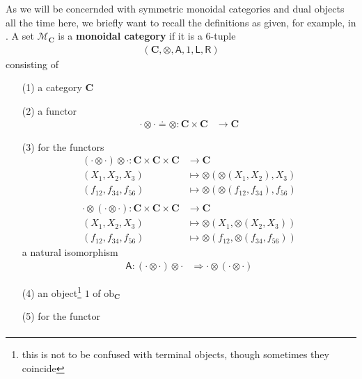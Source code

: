 As we will be concernded with symmetric monoidal categories and dual objects all the time here, we briefly want to recall the definitions as given, for example, in \cite{00000001}. A set $\mathcal{M}_{\mathbf{C}}$ is a \textbf{monoidal category} if it is a $6$-tuple
\begin{align*}
  \left(
    \mathbf{C},
    \otimes,
    \mathsf{A},
    1,
    \mathsf{L},
    \mathsf{R}
  \right)
\end{align*}
consisting of
\begin{enumerate}
\item[(1)]
a category $\mathbf{C}$
\item[(2)]
a functor
\begin{align*}
  \cdot
  \otimes
  \cdot
  \doteq
  \otimes
  \colon
  \mathbf{C}
  \times
  \mathbf{C}
  &\rightarrow
  \mathbf{C}
\end{align*}
\item[(3)]
for the functors
\begin{align*}
  \left(
    \cdot
    \otimes
    \cdot
  \right)
  \otimes
  \cdot
  \colon
  \mathbf{C}
  \times
  \mathbf{C}
  \times
  \mathbf{C}
  &\rightarrow
  \mathbf{C}
  \\
  (X_{1},X_{2},X_{3})
  &\mapsto
  \otimes(\otimes(X_{1},X_{2}),X_{3})
  \\
  (f_{12},f_{34},f_{56})
  &\mapsto
  \otimes(\otimes(f_{12},f_{34}),f_{56})
  \\\\
  \cdot
  \otimes
  \left(
    \cdot
    \otimes
    \cdot
  \right)
  \colon
  \mathbf{C}
  \times
  \mathbf{C}
  \times
  \mathbf{C}
  &\rightarrow
  \mathbf{C}
  \\
  (X_{1},X_{2},X_{3})
  &\mapsto
  \otimes(X_{1},\otimes(X_{2},X_{3}))
  \\
  (f_{12},f_{34},f_{56})
  &\mapsto
  \otimes(f_{12},\otimes(f_{34},f_{56}))
\end{align*}
a natural isomorphism
\begin{align*}
  \mathsf{A}
  \colon
  \left(
    \cdot
    \otimes
    \cdot
  \right)
  \otimes
  \cdot
  &\Rightarrow
  \cdot
  \otimes
  \left(
    \cdot
    \otimes
    \cdot
  \right)
\end{align*}
\item[(4)]
an object\footnote{this is not to be confused with terminal objects, though sometimes they coincide} $1$ of $\mathrm{ob}_{\mathbf{C}}$
\item[(5)]
for the functor
\begin{align*}

\end{align*}
\end{enumerate}
